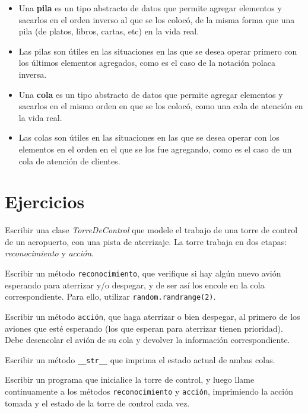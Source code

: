 \begin{itemize}

\item Una {\bf pila} es un tipo abstracto de datos que permite agregar
elementos y sacarlos en el orden inverso al que se los colocó, de la misma
forma que una pila (de platos, libros, cartas, etc) en la vida real.

\item Las pilas son útiles en las situaciones en las que se desea operar
primero con los últimos elementos agregados, como es el caso de la notación
polaca inversa.

\item Una {\bf cola} es un tipo abstracto de datos que permite agregar
elementos y sacarlos en el mismo orden en que se los colocó, como una cola
de atención en la vida real.

\item Las colas son útiles en las situaciones en las que se desea operar
con los elementos en el orden en el que se los fue agregando, como es el
caso de un cola de atención de clientes.

\end{itemize}

\newpage
\section{Ejercicios}

\begin{ejercicio}
Escribir una clase \emph{TorreDeControl} que modele el trabajo de una torre
de control de un aeropuerto, con una pista de aterrizaje.  La torre trabaja
en dos etapas: \emph{reconocimiento} y \emph{acción}.
\begin{partes}
    \item Escribir un método \verb!reconocimiento!, que verifique si hay algún
nuevo avión esperando para aterrizar y/o despegar, y de ser así los encole
en la cola correspondiente. Para ello, utilizar \verb!random.randrange(2)!.
    \item Escribir un método \verb!acción!, que haga aterrizar o
bien despegar, al primero de los aviones que esté esperando (los que
esperan para aterrizar tienen prioridad). Debe desencolar el avión de su
cola y devolver la información correspondiente.
    \item Escribir un método \verb!__str__! que imprima el estado actual de
ambas colas.
    \item Escribir un programa que inicialice la torre de control, y luego llame
continuamente a los métodos \verb!reconocimiento! y \verb!acción!,
imprimiendo la acción tomada y el estado de la torre de control cada vez.
\end{partes}
\end{ejercicio}


